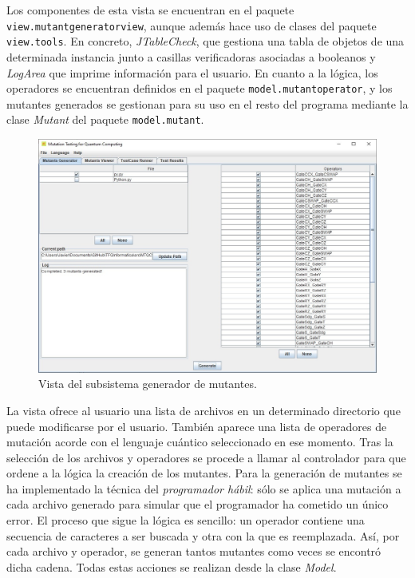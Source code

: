 Los componentes de esta vista se encuentran en el paquete \texttt{view.mutantgeneratorview}, aunque además hace uso de clases del paquete \texttt{view.tools}. En concreto, \textit{JTableCheck}, que gestiona una tabla de  objetos de una determinada instancia junto a casillas verificadoras asociadas a booleanos y \textit{LogArea} que imprime información para el usuario. En cuanto a la lógica, los operadores se encuentran definidos en el paquete \texttt{model.mutantoperator}, y los mutantes generados se gestionan para su uso en el resto del programa mediante la clase \textit{Mutant} del paquete \texttt{model.mutant}.
\begin{figure}[t]
\begin{center}
\includegraphics[scale=0.45]{images/vista1}
\end{center}
\caption{Vista del subsistema generador de mutantes.}
\label{fig:vista1}
\end{figure}
La vista ofrece al usuario una lista de archivos en un determinado directorio que puede modificarse por el usuario. También aparece una lista de operadores de mutación acorde con el lenguaje cuántico seleccionado en ese momento. Tras la selección de los archivos y operadores se procede a llamar al controlador para que ordene a la lógica la creación de los mutantes. Para la generación de mutantes se ha implementado la técnica del {\it programador hábil}: sólo se aplica una mutación a cada archivo generado para simular que el programador ha cometido un único error. El proceso que sigue la lógica es sencillo: un operador contiene una secuencia de caracteres a ser buscada y otra con la que es reemplazada. Así, por cada archivo y operador, se generan tantos mutantes como veces se encontró dicha cadena. Todas estas acciones se realizan desde la clase \textit{Model}.

